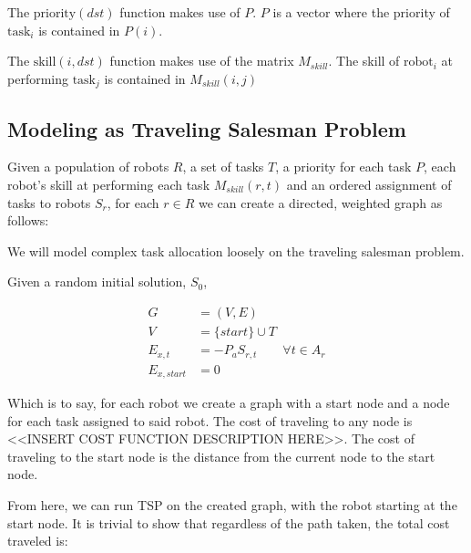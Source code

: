 \documentclass[a4paper]{article}
\begin{document}
The $\text{priority}(\mathit{dst})$ function makes use of $P$. $P$ is a vector where the priority of $\text{task}_i$ is contained in $P(i)$.

The $\text{skill}(i, \mathit{dst})$ function makes use of the matrix $M_{skill}$. The skill of $\text{robot}_i$ at performing $\text{task}_j$ is contained in $M_{skill}(i,j)$

\subsection{Modeling as Traveling Salesman Problem}


Given a population of robots $R$, a set of tasks $T$, a priority for each task $P$, each robot's skill at performing each task $M_{skill}(r,t)$ and an ordered assignment of tasks to robots $S_r$, for each $r \in R$
we can create a directed, weighted graph as follows:

We will model complex task allocation loosely on the traveling salesman problem.

Given a random initial solution, $S_0$,

\begin{align*}
	G &= (V, E) \\
	V &= \{ start \} \cup T \\
	E_{x, t} &= -P_a S_{r,t} \qquad \forall t \in A_r \\
	E_{x, start} &= 0
\end{align*}

Which is to say, for each robot we create a graph with a start node and a node for each task assigned to said robot. The cost of traveling to any node is <<INSERT COST FUNCTION DESCRIPTION HERE>>. The cost of traveling to the start node is the distance from the current node to the start node.

From here, we can run TSP on the created graph, with the robot starting at the start node. It is trivial to show that regardless of the path taken, the total cost traveled is:
\end{document}
